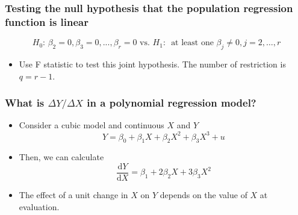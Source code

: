 \documentclass[a4paper,11pt]{article}
\newcommand{\dx}{\mathrm{d}}
\begin{document}
\subsubsection*{Testing the null hypothesis that the population regression function is linear}
\label{sec:org95d6325}
\[ H_0:\, \beta_2 = 0, \beta_3 = 0, ..., \beta_r = 0 \text{ vs. }
H_1:\, \text{ at least one } \beta_j \neq 0, j = 2, \ldots, r \]
\begin{itemize}
\item Use F statistic to test this joint hypothesis. The number of
restriction is \(q = r-1\).
\end{itemize}


\subsubsection*{What is \(\Delta Y / \Delta X\) in a polynomial regression model?}
\label{sec:org8546c12}

\begin{itemize}
\item Consider a cubic model and continuous \(X\) and \(Y\)
\[Y = \beta_0 + \beta_1 X + \beta_2 X^2 + \beta_3 X^3 + u\]
\item Then, we can calculate
\[\frac{\dx Y}{\dx X} = \beta_1 + 2\beta_2 X + 3\beta_3 X^2 \]
\item The effect of a unit change in \(X\) on \(Y\) depends on the value of
\(X\) at evaluation.
\end{itemize}
\end{document}
